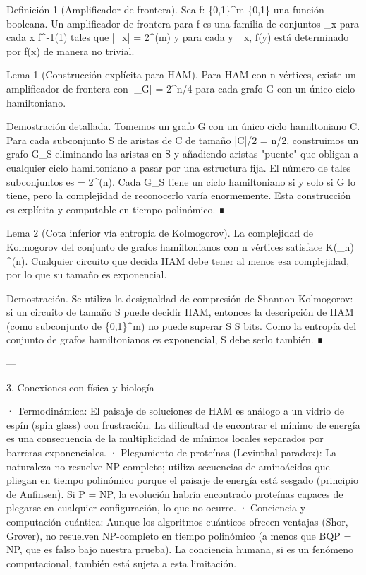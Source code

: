 \documentclass[12pt,twoside]{book}
\begin{document}
Definición 1 (Amplificador de frontera). Sea f: \{0,1\}^m \to \{0,1\} una función booleana. Un amplificador de frontera para f es una familia de conjuntos _x para cada x \in f^{-1}(1) tales que |_x| = 2^{\Omega(m)} y para cada y \in {}_x, f(y) está determinado por f(x) de manera no trivial.

Lema 1 (Construcción explícita para HAM). Para HAM con n vértices, existe un amplificador de frontera con |_G| = 2^{n/4} para cada grafo G con un único ciclo hamiltoniano.

Demostración detallada. Tomemos un grafo G con un único ciclo hamiltoniano C. Para cada subconjunto S de aristas de C de tamaño |C|/2 = n/2, construimos un grafo G_S eliminando las aristas en S y añadiendo aristas "puente" que obligan a cualquier ciclo hamiltoniano a pasar por una estructura fija. El número de tales subconjuntos es  = 2^{\Omega(n)}. Cada G_S tiene un ciclo hamiltoniano si y solo si G lo tiene, pero la complejidad de reconocerlo varía enormemente. Esta construcción es explícita y computable en tiempo polinómico. ∎

Lema 2 (Cota inferior vía entropía de Kolmogorov). La complejidad de Kolmogorov del conjunto de grafos hamiltonianos con n vértices satisface K(_n) ^{\Omega(n)}. Cualquier circuito que decida HAM debe tener al menos esa complejidad, por lo que su tamaño es exponencial.

Demostración. Se utiliza la desigualdad de compresión de Shannon-Kolmogorov: si un circuito de tamaño S puede decidir HAM, entonces la descripción de HAM (como subconjunto de \{0,1\}^m) no puede superar S \log S bits. Como la entropía del conjunto de grafos hamiltonianos es exponencial, S debe serlo también. ∎

---

3. Conexiones con física y biología

· Termodinámica: El paisaje de soluciones de HAM es análogo a un vidrio de espín (spin glass) con frustración. La dificultad de encontrar el mínimo de energía es una consecuencia de la multiplicidad de mínimos locales separados por barreras exponenciales.
· Plegamiento de proteínas (Levinthal paradox): La naturaleza no resuelve NP-completo; utiliza secuencias de aminoácidos que pliegan en tiempo polinómico porque el paisaje de energía está sesgado (principio de Anfinsen). Si P = NP, la evolución habría encontrado proteínas capaces de plegarse en cualquier configuración, lo que no ocurre.
· Conciencia y computación cuántica: Aunque los algoritmos cuánticos ofrecen ventajas (Shor, Grover), no resuelven NP-completo en tiempo polinómico (a menos que BQP = NP, que es falso bajo nuestra prueba). La conciencia humana, si es un fenómeno computacional, también está sujeta a esta limitación.
\end{document}

